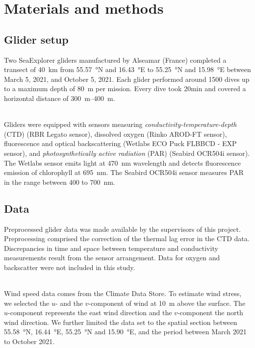 \documentclass[../Main.tex]{subfiles}
\begin{document}
\section*{\crule[blue]{.3cm}{.3cm} Materials and methods}
\subsection*{\crule[blue]{.2cm}{.2cm} Glider setup}
Two SeaExplorer gliders manufactured by Alseamar (France) completed a transect of \SI{40}{km} from \SI{55.57}{\degree}N and \SI{16.43}{\degree}E to \SI{55.25}{\degree}N and \SI{15.98}{\degree}E between March 5, 2021, and October 5, 2021. 
Each glider performed around 1500 dives up to a maximum depth of \SI{80}{m} per mission. 
Every dive took 20min and covered a horizontal distance of \SIrange{300}{400}{m}. 

\\ 
Gliders were equipped with sensors measuring \emph{conductivity-temperature-depth} (CTD) (RBR Legato sensor), dissolved oxygen (Rinko AROD-FT sensor), fluorescence and optical backscattering (Wetlabs ECO Puck FLBBCD - EXP sensor), and \emph{photosynthetically active radiation} (PAR) (Seabird OCR504i sensor). 
The Wetlabs sensor emits light at \SI{470}{nm} wavelength and detects fluorescence emission of chlorophyll at \SI{695}{nm}. 
The Seabird OCR504i sensor measures PAR in the range between 400 to \SI{700}{nm}.\supercite{ACSA2014}

\subsection*{\crule[blue]{.2cm}{.2cm} Data}
Preprocessed glider data was made available by the supervisors of this project. Preprocessing comprised the correction of the thermal lag error in the CTD data.
Discrepancies in time and space between temperature and conductivity measurements result from the sensor arrangement.\supercite{Garau2011}
Data for oxygen and backscatter were not included in this study.

\\
Wind speed data comes from the Climate Data Store.\supercite{era} 
To estimate wind stress, we selected the $u$- and the $v$-component of wind at \SI{10}{m} above the surface. 
The $u$-component represents the east wind direction and the $v$-component the north wind direction.\supercite{era2} 
We further limited the data set to the spatial section between \SI{55.58}{\degree}N, \SI{16.44}{\degree}E, \SI{55.25}{\degree}N and \SI{15.90}{\degree}E, and the period between March 2021 to October 2021. 
\end{document}
